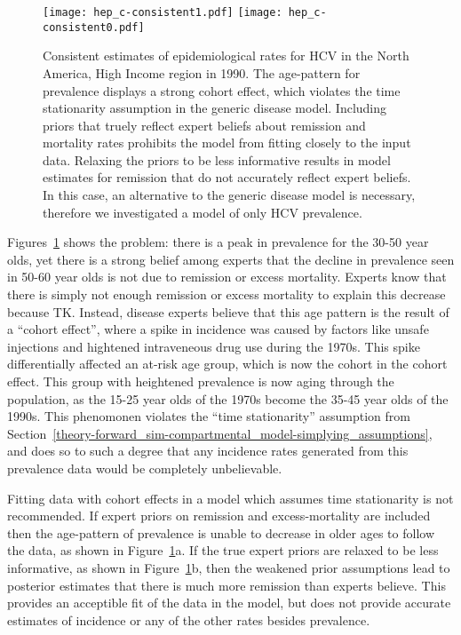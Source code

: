 \begin{figure}
\begin{center}
\texttt{[image: hep\_c-consistent1.pdf]}
\texttt{[image: hep\_c-consistent0.pdf]}
\end{center}
\caption{Consistent estimates of epidemiological rates for HCV in the
  North America, High Income region in 1990. The age-pattern for
  prevalence displays a strong cohort effect, which violates the time
  stationarity assumption in the generic disease model.  Including
  priors that truely reflect expert beliefs about remission and
  mortality rates prohibits the model from fitting closely to the
  input data.  Relaxing the priors to be less informative results in
  model estimates for remission that do not accurately reflect expert
  beliefs.  In this case, an alternative to the generic disease model
  is necessary, therefore we investigated a model of only HCV
  prevalence.  }
\label{hep_c-consistent}
\end{figure}


Figures~\ref{hep_c-consistent} shows the problem: there is a peak in
prevalence for the 30-50 year olds, yet there is a strong belief among
experts that the decline in prevalence seen in 50-60 year olds is not
due to remission or excess mortality.  Experts know that there is
simply not enough remission or excess mortality to explain this
decrease because TK.  Instead, disease experts believe that this age
pattern is the result of a ``cohort effect'', where a spike in
incidence was caused by factors like unsafe injections and hightened
intraveneous drug use during the 1970s.  This spike differentially
affected an at-risk age group, which is now the cohort in the cohort
effect.  This group with heightened prevalence is now aging through
the population, as the 15-25 year olds of the 1970s become the 35-45
year olds of the 1990s.  This phenomonen violates the ``time
stationarity'' assumption from
Section~\ref{theory-forward_sim-compartmental_model-simplying_assumptions},
and does so to such a degree that any incidence rates generated from
this prevalence data would be completely unbelievable.

Fitting data with cohort effects in a model which assumes time
stationarity is not recommended.  If expert priors on remission and
excess-mortality are included then the age-pattern of prevalence is
unable to decrease in older ages to follow the data, as shown in
Figure~\ref{hep_c-consistent}a. If the true expert priors are relaxed
to be less informative, as shown in Figure~\ref{hep_c-consistent}b,
then the weakened prior assumptions lead to posterior estimates that
there is much more remission than experts believe.  This provides an
acceptible fit of the data in the model, but does not provide accurate
estimates of incidence or any of the other rates besides prevalence.

